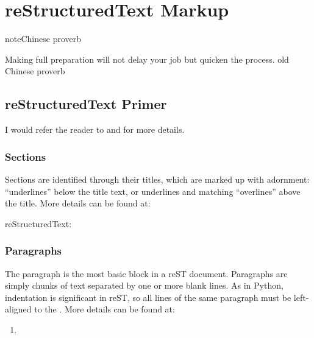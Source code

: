\documentclass[letterpaper,11pt,english]{sphinxmanual}
\begin{document}
\chapter{reStructuredText Markup}
\label{\detokenize{rtxt:restructuredtext-markup}}\label{\detokenize{rtxt:rtext}}\label{\detokenize{rtxt::doc}}
\begin{sphinxadmonition}{note}{Chinese proverb}

Making full preparation will not delay your job but quicken the process. \textendash{} old Chinese proverb
\end{sphinxadmonition}


\section{reStructuredText Primer}
\label{\detokenize{rtxt:restructuredtext-primer}}
I would refer the reader to  and  for more details.


\subsection{Sections}
\label{\detokenize{rtxt:sections}}
Sections are identified through their titles, which are marked up with adornment: “underlines” below the title text, or underlines and matching “overlines” above the title. More details can be found at: 

reStructuredText:

\begin{sphinxVerbatim}[commandchars=\\\{\}]


\end{sphinxVerbatim}


\subsection{Paragraphs}
\label{\detokenize{rtxt:paragraphs}}
The paragraph is the most basic block in a reST document.
Paragraphs are simply chunks of text separated by one or
more blank lines. As in Python, indentation is significant
in reST, so all lines of the same paragraph must be
left-aligned to the . More
details can be found at: 
\begin{enumerate}
\def\theenumi{\arabic{enumi}}
\def\labelenumi{\theenumi .}
\makeatletter\def\p@enumii{\p@enumi \theenumi .}\makeatother
\item {} 

\end{enumerate}
\end{document}
